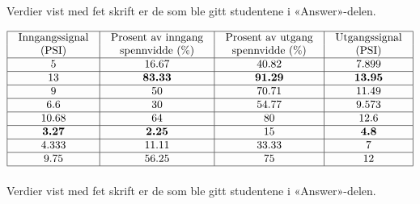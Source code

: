 Verdier vist med fet skrift er de som ble gitt studentene i «Answer»-delen.
\noindent









$$\vbox{\offinterlineskip
\halign{\strut
\vrule \quad\hfil # \ \hfil & 
\vrule \quad\hfil # \ \hfil & 
\vrule \quad\hfil # \ \hfil & 
\vrule \quad\hfil # \ \hfil \vrule \cr
\noalign{\hrule}
%
Inngangssignal & Prosent av inngang & Prosent av utgang & Utgangssignal \cr
%
(PSI) & spennvidde (\%) & spennvidde (\%) & (PSI) \cr
%
\noalign{\hrule}
%
5 & 16.67 & 40.82 & 7.899 \cr
%
\noalign{\hrule}
%
13 & {\bf 83.33} & {\bf 91.29} & {\bf 13.95} \cr
%
\noalign{\hrule}
%
9 & 50 & 70.71 & 11.49 \cr
%
\noalign{\hrule}
%
6.6 & 30 & 54.77 & 9.573 \cr
%
\noalign{\hrule}
%
10.68 & 64 & 80 & 12.6 \cr
%
\noalign{\hrule}
%
{\bf 3.27} & {\bf 2.25} & 15 & {\bf 4.8} \cr
%
\noalign{\hrule}
%
4.333 & 11.11 & 33.33 & 7 \cr
%
\noalign{\hrule}
%
9.75 & 56.25 & 75 & 12 \cr
%
\noalign{\hrule}
} %
}$$ %

Verdier vist med fet skrift er de som ble gitt studentene i «Answer»-delen.


